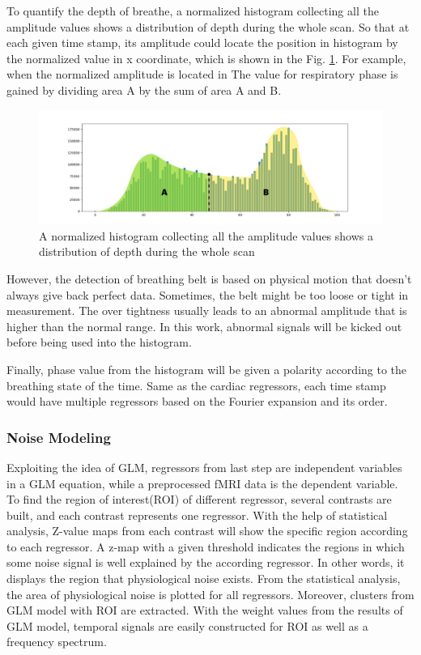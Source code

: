 To quantify the depth of breathe, a normalized histogram collecting all the amplitude values
shows a distribution of depth during the whole scan. 
So that at each given time stamp, its amplitude could locate the position in histogram by the normalized value in x coordinate,
which is shown in the Fig. \ref{fig:hist}. For example, when the normalized amplitude is located in 
The value for respiratory phase is gained by dividing area A by the sum of area A and B.

\begin{figure}[htp]
    \centering
    \includegraphics[width=\columnwidth]{Figures/histogram.png}
    \caption{A normalized histogram collecting all the amplitude values shows a distribution of depth during the whole scan}
    \label{fig:hist}
\end{figure}

However, the detection of breathing belt is based on physical motion that doesn't always give back
perfect data. Sometimes, the belt might be too loose or tight in measurement. The over tightness usually leads
to an abnormal amplitude that is higher than the normal range. In this work, abnormal signals will be 
kicked out before being used into the histogram.

Finally, phase value from the histogram will be given a polarity according to the breathing state of the time.
Same as the cardiac regressors, each time stamp would have multiple regressors based 
on the Fourier expansion and its order.


\subsubsection{Noise Modeling}

Exploiting the idea of GLM, regressors from last step are independent variables in a GLM 
equation, while a preprocessed fMRI data is the dependent variable. 
To find the region of interest(ROI) of different regressor, several contrasts are built, and
each contrast represents one regressor. With the help of statistical analysis, 
Z-value maps from each contrast will show the specific region according to each regressor.
A z-map with a given threshold indicates the regions in which 
some noise signal is well explained by the according regressor.
In other words, it displays the region that physiological noise exists. 
From the statistical analysis, the area of physiological noise is plotted for all regressors.
Moreover, clusters from GLM model with ROI are extracted. With the weight values from the results of GLM model, 
temporal signals are easily constructed for ROI as well as a frequency spectrum.


